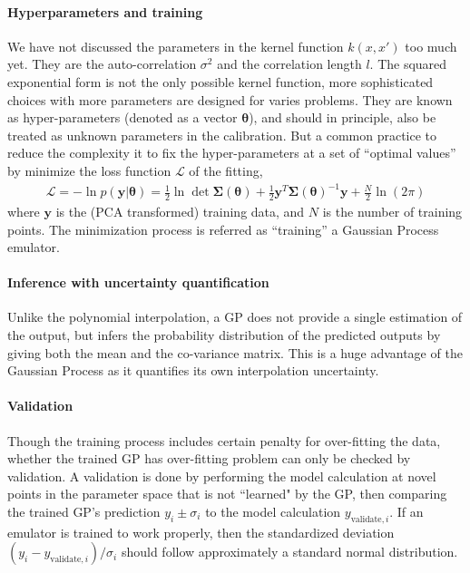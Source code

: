 \paragraph{Hyperparameters and training} We have not discussed the parameters in the kernel function $k(x, x')$ too much yet.
They are the auto-correlation $\sigma^2$ and the correlation length $l$. 
The squared exponential form is not the only possible kernel function, more sophisticated choices with more parameters are designed for varies problems.
They are known as hyper-parameters (denoted as a vector $\mathbf{\theta}$), and should in principle, also be treated as unknown parameters in the calibration.
But a common practice to reduce the complexity it to fix the hyper-parameters at a set of ``optimal values'' by minimize the loss function $\mathcal{L}$ of the fitting,
\begin{eqnarray}
\mathcal{L} = -\ln p(\mathbf{y}|\mathbf{\theta}) = \frac{1}{2}\ln \det \mathbf{\Sigma}(\mathbf{\theta})  + \frac{1}{2}\mathbf{y}^T \mathbf{\Sigma}(\mathbf{\theta})^{-1} \mathbf{y} + \frac{N}{2}\ln(2\pi)
\end{eqnarray}
where $\mathbf{y}$ is the (PCA transformed) training data, and $N$ is the number of training points.
The minimization process is referred as ``training'' a Gaussian Process emulator.

\paragraph{Inference with uncertainty quantification} Unlike the polynomial interpolation, a GP does not provide a single estimation of the output, but infers the probability distribution of the predicted outputs by giving both the mean and the co-variance matrix.
This is a huge advantage of the Gaussian Process as it quantifies its own interpolation uncertainty.

\paragraph{Validation} Though the training process includes certain penalty for over-fitting the data, whether the trained GP has over-fitting problem can only be checked by validation.
A validation is done by performing the model calculation at novel points in the parameter space that is not ``learned" by the GP, then comparing the trained GP's prediction $y_i \pm \sigma_i$ to the model calculation $y_{\textrm{validate}, i}$.
If an emulator is trained to work properly, then the standardized deviation $(y_i - y_{\textrm{validate}, i})/\sigma_i$ should follow approximately a standard normal distribution.

